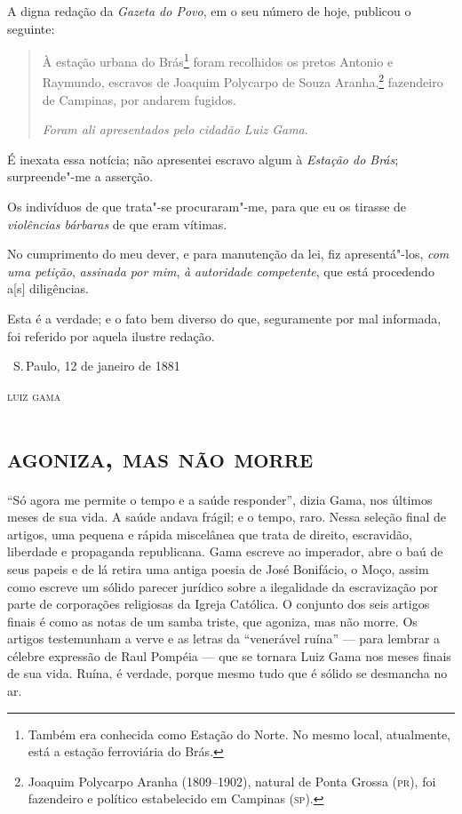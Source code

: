 A digna redação da \emph{Gazeta do Povo}, em o seu número de hoje,
publicou o seguinte:

\begin{quote}
À estação urbana do Brás\footnote{Também era conhecida como Estação
  do Norte. No mesmo local, atualmente, está a estação ferroviária do
  Brás.} foram recolhidos os pretos Antonio e Raymundo, escravos de
Joaquim Polycarpo de Souza Aranha,\footnote{Joaquim Polycarpo Aranha
  (1809--1902), natural de Ponta Grossa (\textsc{pr}), foi fazendeiro e político
  estabelecido em Campinas (\textsc{sp}).}
fazendeiro de Campinas, por
andarem fugidos.

\emph{Foram ali apresentados pelo cidadão Luiz Gama}.
\end{quote}

É inexata essa notícia; não apresentei escravo algum à \emph{Estação do
Brás}; surpreende"-me a asserção.

Os indivíduos de que trata"-se procuraram"-me, para que eu os tirasse de
\emph{violências bárbaras} de que eram vítimas.

No cumprimento do meu dever, e para manutenção da lei, fiz
apresentá"-los, \emph{com uma petição}, \emph{assinada por mim}, \emph{à}
\emph{autoridade competente}, que está procedendo a{[}s{]} diligências.

Esta é a verdade; e o fato bem diverso do que, seguramente por mal
informada, foi referido por aquela ilustre redação.

\bigskip

\hfill\ S.\,Paulo, 12 de janeiro de 1881

\hfill\textsc{luiz gama}

\paginabranca
\begingroup\makeatletter\@openrightfalse
\part{\textsc{agoniza, mas não morre}}

\mbox{}\vfill
\thispagestyle{empty}

{\footnotesize\noindent
``Só agora me permite o tempo e a saúde responder'', dizia Gama, nos
últimos meses de sua vida. A saúde andava frágil; e o tempo, raro. Nessa
seleção final de artigos, uma pequena e rápida miscelânea que trata de
direito, escravidão, liberdade e propaganda republicana. Gama escreve ao
imperador, abre o baú de seus papeis e de lá retira uma antiga poesia de
José Bonifácio, o Moço, assim como escreve um sólido parecer jurídico
sobre a ilegalidade da escravização por parte de corporações religiosas
da Igreja Católica. O conjunto dos seis artigos finais é como as notas
de um samba triste, que agoniza, mas não morre. Os artigos testemunham a
verve e as letras da ``venerável ruína'' --- para lembrar a célebre
expressão de Raul Pompéia --- que se tornara Luiz Gama nos meses finais
de sua vida. Ruína, é verdade, porque mesmo tudo que é sólido se
desmancha no ar.}
\@openrighttrue\makeatother\endgroup


